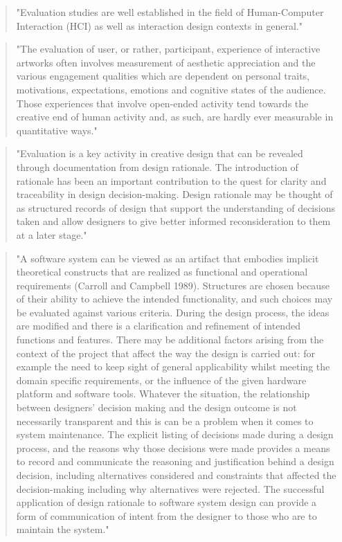 \begin{quote}
"Evaluation studies are well established in the field of Human-Computer Interaction (HCI) as well as interaction design contexts in general." \citep[p.8]{Candy2012}
\end{quote}

\begin{quote}
"The evaluation of user, or rather, participant, experience of interactive artworks often involves measurement of aesthetic appreciation and the various engagement qualities which are dependent on personal traits, motivations, expectations, emotions and cognitive states of the audience. Those experiences that involve open-ended activity tend towards the creative end of human activity and, as such, are hardly ever measurable in quantitative ways."  \citep[p.8]{Candy2012}
\end{quote}

\begin{quote}
"Evaluation is a key activity in creative design that can be revealed through documentation from design rationale. The introduction of rationale has been an important contribution to the quest for clarity and traceability in design decision-making. Design rationale may be thought of as structured records of design that support the understanding of decisions taken and allow designers to give better informed reconsideration to them at a later stage." \citep[p.9]{Candy2012}
\end{quote}

\begin{quote}
"A software system can be viewed as an artifact that embodies implicit theoretical constructs that are realized as functional and operational requirements (Carroll and Campbell 1989). Structures are chosen because of their ability to achieve the intended functionality, and such choices may be evaluated against various criteria. During the design process, the ideas are modified and there is a clarification and refinement of intended functions and features. There may be additional factors arising from the context of the project that affect the way the design is carried out: for example the need to keep sight of general applicability whilst meeting the domain specific requirements, or the influence of the given hardware platform and software tools. Whatever the situation, the relationship between designers' decision making and the design outcome is not necessarily transparent and this is can be a problem when it comes to system maintenance. The explicit listing of decisions made during a design process, and the reasons why those decisions were made provides a means to record and communicate the reasoning and justification behind a design decision, including alternatives considered and constraints that affected the decision-making including why alternatives were rejected. The successful application of design rationale to software system design can provide a form of communication of intent from the designer to those who are to maintain the system." \citep[p.9]{Candy2012}
\end{quote}

